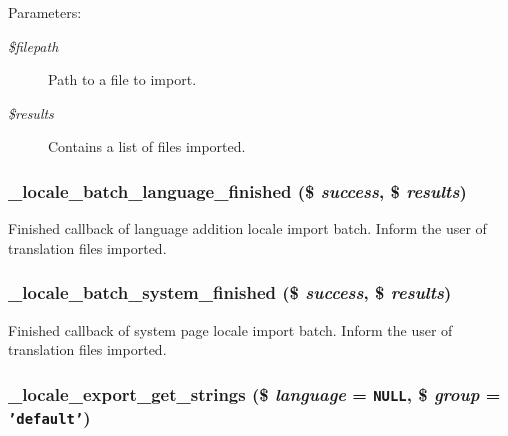 \begin{Desc}
\item[Parameters:]
\begin{description}
\item[{\em \$filepath}]Path to a file to import. \item[{\em \$results}]Contains a list of files imported. \end{description}
\end{Desc}
\hypertarget{group__locale_g06bd6310727083246869907515bea547}{
\subsubsection[{\_\-locale\_\-batch\_\-language\_\-finished}]{\setlength{\rightskip}{0pt plus 5cm}\_\-locale\_\-batch\_\-language\_\-finished (\$ {\em success}, \/  \$ {\em results})}}
\label{group__locale_g06bd6310727083246869907515bea547}


Finished callback of language addition locale import batch. Inform the user of translation files imported. \hypertarget{group__locale_g3b7cc14a5735d2aee066dd4f6bb517b8}{
\subsubsection[{\_\-locale\_\-batch\_\-system\_\-finished}]{\setlength{\rightskip}{0pt plus 5cm}\_\-locale\_\-batch\_\-system\_\-finished (\$ {\em success}, \/  \$ {\em results})}}
\label{group__locale_g3b7cc14a5735d2aee066dd4f6bb517b8}


Finished callback of system page locale import batch. Inform the user of translation files imported. \hypertarget{group__locale_gde17be27a5240ba4804dc51eccf40246}{
\subsubsection[{\_\-locale\_\-export\_\-get\_\-strings}]{\setlength{\rightskip}{0pt plus 5cm}\_\-locale\_\-export\_\-get\_\-strings (\$ {\em language} = {\tt NULL}, \/  \$ {\em group} = {\tt 'default'})}}
\label{group__locale_gde17be27a5240ba4804dc51eccf40246}


